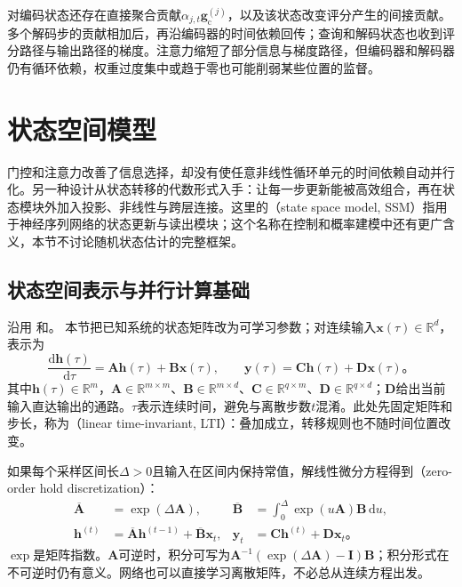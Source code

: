 对编码状态还存在直接聚合贡献$\alpha_{j,t}\bm{g}_{\mathrm{c}}^{(j)}$，以及该状态改变评分产生的间接贡献。多个解码步的贡献相加后，再沿编码器的时间依赖回传；查询和解码状态也收到评分路径与输出路径的梯度。注意力缩短了部分信息与梯度路径，但编码器和解码器仍有循环依赖，权重过度集中或趋于零也可能削弱某些位置的监督。

\section{状态空间模型}
\label{sec:rnn-state-space}

门控和注意力改善了信息选择，却没有使任意非线性循环单元的时间依赖自动并行化。另一种设计从状态转移的代数形式入手：让每一步更新能被高效组合，再在状态模块外加入投影、非线性与跨层连接。这里的（state space model, SSM）指用于神经序列网络的状态更新与读出模块；这个名称在控制和概率建模中还有更广含义，本节不讨论随机状态估计的完整框架。

\subsection{状态空间表示与并行计算基础}
\label{sec:rnn-ssm-foundations}

沿用
和。
本节把已知系统的状态矩阵改为可学习参数；对连续输入$\bm{x}(\tau)\in\mathbb{R}^{d}$，表示为
\begin{equation}
  \frac{\mathrm{d}\bm{h}(\tau)}{\mathrm{d}\tau}
    =\bm{A}\bm{h}(\tau)+\bm{B}\bm{x}(\tau),
  \qquad
  \bm{y}(\tau)=\bm{C}\bm{h}(\tau)+\bm{D}\bm{x}(\tau)\text{。}
  \label{eq:rnn-continuous-ssm}
\end{equation}
其中$\bm{h}(\tau)\in\mathbb{R}^{m}$，$\bm{A}\in\mathbb{R}^{m\times m}$、$\bm{B}\in\mathbb{R}^{m\times d}$、$\bm{C}\in\mathbb{R}^{q\times m}$、$\bm{D}\in\mathbb{R}^{q\times d}$；$\bm{D}$给出当前输入直达输出的通路。$\tau$表示连续时间，避免与离散步数$t$混淆。此处先固定矩阵和步长，称为（linear time-invariant, LTI）：叠加成立，转移规则也不随时间位置改变。

如果每个采样区间长$\Delta>0$且输入在区间内保持常值，解线性微分方程得到（zero-order hold discretization）：
\begin{equation}
  \begin{aligned}
    \overline{\bm{A}}&=\exp(\Delta\bm{A}),
    &\overline{\bm{B}}&=\int_0^{\Delta}\exp(u\bm{A})\bm{B}\,\mathrm{d}u,\\
    \bm{h}^{(t)}&=\overline{\bm{A}}\bm{h}^{(t-1)}
       +\overline{\bm{B}}\bm{x}_t,
    &\bm{y}_t&=\bm{C}\bm{h}^{(t)}+\bm{D}\bm{x}_t\text{。}
  \end{aligned}
  \label{eq:rnn-ssm-zoh}
\end{equation}
$\exp$是矩阵指数。$\bm{A}$可逆时，积分可写为$\bm{A}^{-1}(\exp(\Delta\bm{A})-\bm{I})\bm{B}$；积分形式在不可逆时仍有意义。网络也可以直接学习离散矩阵，不必总从连续方程出发。

